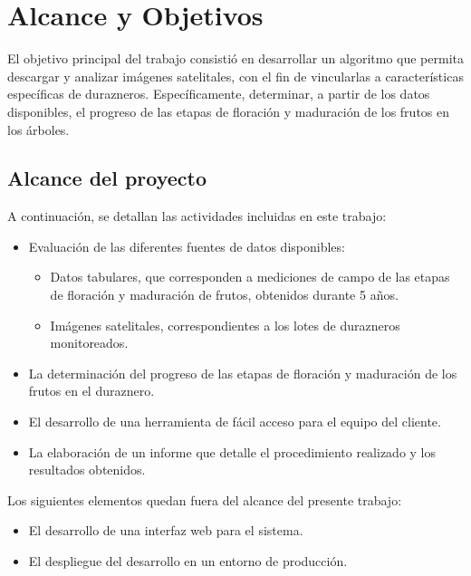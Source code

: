 \section{Alcance y Objetivos}
El objetivo principal del trabajo consistió en desarrollar un algoritmo que permita descargar y analizar 
imágenes satelitales, con el fin de vincularlas a características específicas de durazneros. Específicamente, 
determinar, a partir de los datos disponibles, el progreso de las etapas de floración y maduración de 
los frutos en los árboles.

\subsection{Alcance del proyecto}
A continuación, se detallan las actividades incluidas en este trabajo:

\begin{itemize}
  \item Evaluación de las diferentes fuentes de datos disponibles:
  \begin{itemize}
    \item Datos tabulares, que corresponden a mediciones de campo
    de las etapas de floración y maduración de frutos, obtenidos durante 5
    años.
    \item Imágenes satelitales, correspondientes a los lotes de durazneros monitoreados.
    \end{itemize}
  \item La determinación del progreso de las etapas de floración y maduración de
  los frutos en el duraznero.
  \item El desarrollo de una herramienta de fácil acceso para el equipo del cliente.
  \item La elaboración de un informe que detalle el procedimiento realizado y los resultados obtenidos.  
  \end{itemize}

  Los siguientes elementos quedan fuera del alcance del presente trabajo:
  \begin{itemize}
    \item El desarrollo de una interfaz web para el sistema.
    \item El despliegue del desarrollo en un entorno de producción.
    \end{itemize}

